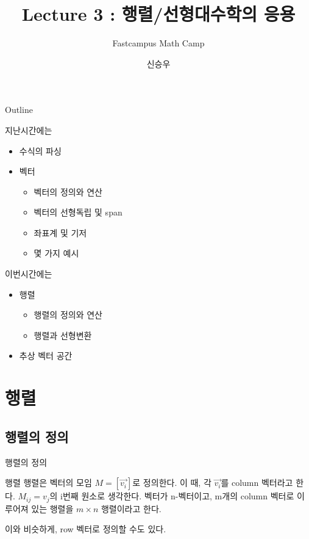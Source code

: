 \documentclass{beamer}
\title{Lecture 3 : 행렬/선형대수학의 응용}
\subtitle{Fastcampus Math Camp}
\author{신승우}
\begin{document}
\begin{frame}
  \titlepage
\end{frame}

\begin{frame}{Outline}
  \tableofcontents[hideallsubsections]
\end{frame}


\begin{frame}
지난시간에는 

\begin{itemize}
\item 수식의 파싱 
\item 벡터
\begin{itemize} 
\item 벡터의 정의와 연산 
\item 벡터의 선형독립 및 span 
\item 좌표계 및 기저 
\item 몇 가지 예시 
\end{itemize}
\end{itemize}

이번시간에는 

\begin{itemize} 
\item 행렬
\begin{itemize} 
\item 행렬의 정의와 연산 
\item 행렬과 선형변환 
\end{itemize} 
\item 추상 벡터 공간 
\end{itemize}

\end{frame}

\section{행렬} 



\subsection{행렬의 정의} 
\begin{frame}{행렬의 정의}
\begin{block}{행렬}  
행렬은 벡터의 모임 $M = [\vec{v_i}]$로 정의한다. 이 때, 각 $\vec{v_i}$를 column 벡터라고 한다. $M_{ij} = v_j$의 i번째 원소로 생각한다. 벡터가 n-벡터이고, m개의 column 벡터로 이루어져 있는 행렬을 $m \times n$ 행렬이라고 한다. 
\end{block}
이와 비슷하게, row 벡터로 정의할 수도 있다. 
\end{frame}
\end{document}
